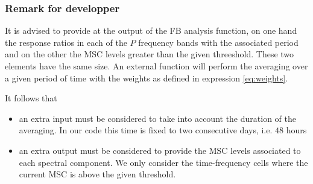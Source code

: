 \subsubsection{Remark for developper}

It is advised to provide at the output of the FB analysis function, on one hand the response ratios in each of the $P$ frequency bands  with the associated period and on the other the MSC levels greater than the given threeshold. These two elements have the same size. An external function will perform the averaging over a given period of time with the weights as defined in expression \ref{eq:weights}.

It follows that 
\begin{itemize}
\item
 an extra input must be considered to take into account the duration of the averaging. In our code this time is fixed to two consecutive days, i.e. $48$ hours
\item
 an extra output must be considered to provide the MSC levels associated to each spectral component. We only consider the time-frequency cells where the current MSC is above the given threshold.

\end{itemize}


